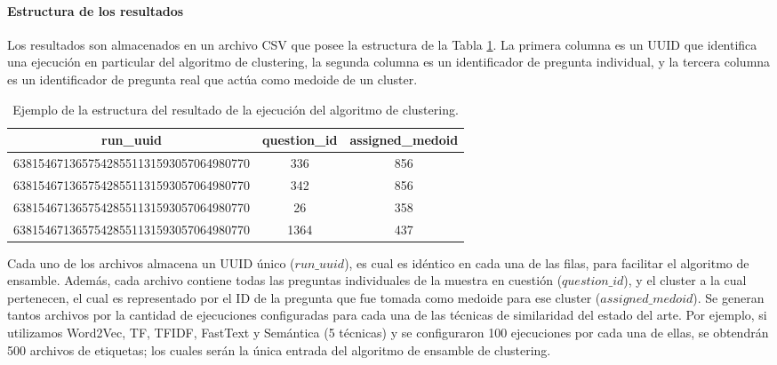 \paragraph{Estructura de los resultados}
Los resultados son almacenados en un archivo CSV que posee la estructura de la Tabla \ref{tab:salida-clustering}. La primera columna es un UUID que identifica una ejecución en particular del algoritmo de clustering, la segunda columna es un identificador de pregunta individual, y la tercera columna es un identificador de pregunta real que actúa como medoide de un cluster.

\begin{table}[h!]
	\footnotesize
	\caption{Ejemplo de la estructura del resultado de la ejecución del algoritmo de clustering.}
	\begin{tabularx}{\textwidth}{ccc}
		\toprule
		\textbf{run\_uuid}                       & \textbf{question\_id} & \textbf{assigned\_medoid} \\
		\midrule
		63815467136575428551131593057064980770 & 336 & 856 \\
		63815467136575428551131593057064980770 & 342& 856 \\
		63815467136575428551131593057064980770 & 26 & 358 \\
		63815467136575428551131593057064980770 & 1364 & 437 \\
		\bottomrule
	\end{tabularx}
	\label{tab:salida-clustering}
\end{table}
Cada uno de los archivos almacena un UUID único (\(run\_uuid\)), es cual es idéntico en cada una de las filas, para facilitar el algoritmo de ensamble. Además, cada archivo contiene todas las preguntas individuales de la muestra en cuestión (\(question\_id\)), y el cluster a la cual pertenecen, el cual es representado por el ID de la pregunta que fue tomada como medoide para ese cluster (\(assigned\_medoid\)). Se generan tantos archivos por la cantidad de ejecuciones configuradas para cada una de las técnicas de similaridad del estado del arte. Por ejemplo, si utilizamos Word2Vec, TF, TFIDF, FastText y Semántica (5 técnicas) y se configuraron 100 ejecuciones por cada una de ellas, se obtendrán 500 archivos de etiquetas; los cuales serán la única entrada del algoritmo de ensamble de clustering.





